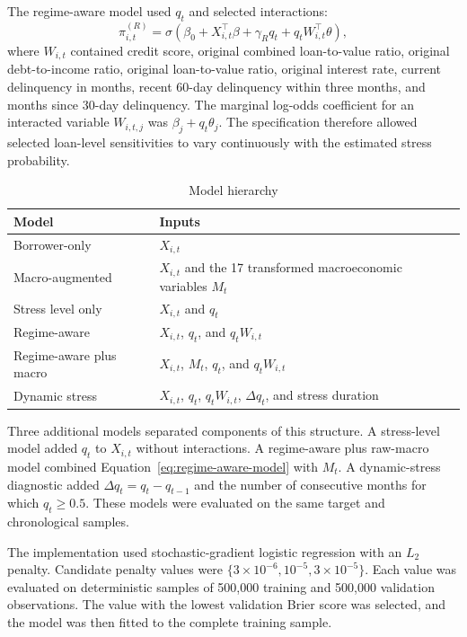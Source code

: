 The regime-aware model used $q_t$ and selected interactions:
\begin{equation}
\pi_{i,t}^{(R)}
=
\sigma\!\left(\beta_0+X_{i,t}^{\top}\beta+\gamma_Rq_t
+q_tW_{i,t}^{\top}\theta\right),
\label{eq:regime-aware-model}
\end{equation}
where $W_{i,t}$ contained credit score, original combined loan-to-value ratio, original debt-to-income ratio, original loan-to-value ratio, original interest rate, current delinquency in months, recent 60-day delinquency within three months, and months since 30-day delinquency. The marginal log-odds coefficient for an interacted variable $W_{i,t,j}$ was $\beta_j+q_t\theta_j$. The specification therefore allowed selected loan-level sensitivities to vary continuously with the estimated stress probability.

\begin{table}[htbp]
\centering
\caption{Model hierarchy}
\label{tab:model-hierarchy}
\small
\begin{tabular}{L{0.28\textwidth}L{0.56\textwidth}}
\toprule
Model & Inputs \\
\midrule
Borrower-only & $X_{i,t}$ \\
Macro-augmented & $X_{i,t}$ and the 17 transformed macroeconomic variables $M_t$ \\
Stress level only & $X_{i,t}$ and $q_t$ \\
Regime-aware & $X_{i,t}$, $q_t$, and $q_tW_{i,t}$ \\
Regime-aware plus macro & $X_{i,t}$, $M_t$, $q_t$, and $q_tW_{i,t}$ \\
Dynamic stress & $X_{i,t}$, $q_t$, $q_tW_{i,t}$, $\Delta q_t$, and stress duration \\
\bottomrule
\end{tabular}
\end{table}

Three additional models separated components of this structure. A stress-level model added $q_t$ to $X_{i,t}$ without interactions. A regime-aware plus raw-macro model combined Equation~\eqref{eq:regime-aware-model} with $M_t$. A dynamic-stress diagnostic added $\Delta q_t=q_t-q_{t-1}$ and the number of consecutive months for which $q_t\geq0.5$. These models were evaluated on the same target and chronological samples.

The implementation used stochastic-gradient logistic regression with an $L_2$ penalty. Candidate penalty values were $\{3\times10^{-6},10^{-5},3\times10^{-5}\}$. Each value was evaluated on deterministic samples of 500,000 training and 500,000 validation observations. The value with the lowest validation Brier score was selected, and the model was then fitted to the complete training sample.


